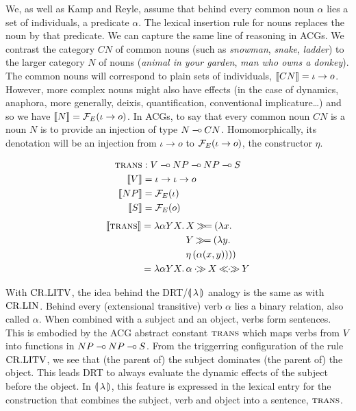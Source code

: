 \vspace{3mm}

We, as well as Kamp and Reyle, assume that behind every common noun
$\alpha$ lies a set of individuals, a predicate $\alpha$. The lexical
insertion rule for nouns replaces the noun by that predicate. We can
capture the same line of reasoning in ACGs. We contrast the category $CN$
of common nouns (such as \emph{snowman}, \emph{snake}, \emph{ladder}) to
the larger category $N$ of nouns (\emph{animal in your garden}, \emph{man
  who owns a donkey}). The common nouns will correspond to plain sets of
individuals, $\llbracket CN \rrbracket = \iota \to o$. However, more complex nouns might
also have effects (in the case of dynamics, anaphora, more generally,
deixis, quantification, conventional implicature\ldots) and so we have
$\llbracket N \rrbracket = \mathcal{F}_E(\iota \to o)$. In ACGs, to say that every common noun $CN$
is a noun $N$ is to provide an injection of type $N \mathbin{{-}\mkern-3.5mu{\circ}}
CN$. Homomorphically, its denotation will be an injection from
$\iota \to o$ to $\mathcal{F}_E(\iota \to o)$, the constructor $\eta$.

\vspace{3mm}

\begin{minipage}{0.5\textwidth}
\crlitvbox
\end{minipage}
\begin{minipage}{0.5\textwidth}
\begin{align*}
\textsc{trans} &: V \mathbin{{-}\mkern-3.5mu{\circ}} NP \mathbin{{-}\mkern-3.5mu{\circ}} NP \mathbin{{-}\mkern-3.5mu{\circ}} S \\
\llbracket V \rrbracket &= \iota \to \iota \to o \\
\llbracket NP \rrbracket &= \mathcal{F}_E(\iota) \\
\llbracket S \rrbracket &= \mathcal{F}_E(o)
\end{align*}
\begin{align*}
\sem{\abs{trans}} = \lam{\alpha Y X}{&X \hsbind (\lam{x}{ \\
                                     &Y \hsbind (\lam{y}{ \\
                                     &\etaE{(\alpha(x, y))}})})} \\
                  = \lam{\alpha Y X}{&\alpha \apr X \aplr Y}
\end{align*}
\end{minipage}

\vspace{3mm}

With $\mathrm{CR.LITV}$, the idea behind the DRT/$\llparenthesis \, \lambda \, \rrparenthesis$ analogy is the
same as with $\mathrm{CR.LIN}$. Behind every (extensional transitive) verb $\alpha$
lies a binary relation, also called $\alpha$. When combined with a subject
and an object, verbs form sentences. This is embodied by the ACG abstract
constant $\textsc{trans}$ which maps verbs from $V$ into functions in
$NP \mathbin{{-}\mkern-3.5mu{\circ}} NP \mathbin{{-}\mkern-3.5mu{\circ}} S$. From the triggerring configuration of the rule
$\mathrm{CR.LITV}$, we see that (the parent of) the subject dominates (the parent
of) the object. This leads DRT to always evaluate the dynamic effects of
the subject before the object. In $\llparenthesis \, \lambda \, \rrparenthesis$, this feature is
expressed in the lexical entry for the construction that combines the
subject, verb and object into a sentence, $\textsc{trans}$.


